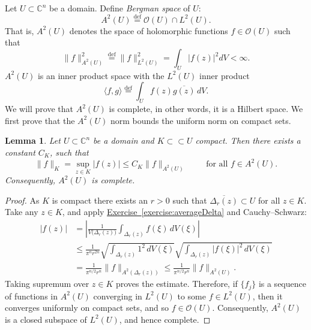 \documentclass[12pt,openany]{book}
\newcommand{\linnprod}[2]{\langle #1 , #2 \rangle}
\newcommand{\sabs}[1]{\lvert {#1} \rvert}
\newcommand{\snorm}[1]{\lVert {#1} \rVert}
\newcommand{\abs}[1]{\left\lvert {#1} \right\rvert}
\newcommand{\C}{{\mathbb{C}}}
\newcommand{\sO}{{\mathscr{O}}}
\newcommand{\myindex}[1]{#1\index{#1}}
\theoremstyle{plain}
\newtheorem{lemma}[thm]{Lemma}
\theoremstyle{remark}
\theoremstyle{definition}
\theoremstyle{exercise}
\theoremstyle{example}
\newcommand{\exerciseref}[1]{\hyperref[#1]{Exercise~\ref*{#1}}}
\begin{document}
Let $U \subset \C^n$ be a domain.  Define
\emph{\myindex{Bergman space}} of $U$:
%
%
\begin{equation*}
A^2(U) \overset{\text{def}}{=} \sO(U) \cap L^2(U) .
\end{equation*}
That is, $A^2(U)$ denotes the space
of holomorphic functions $f \in \sO(U)$ such that
%
\begin{equation*}
\snorm{f}_{A^2(U)}^2 \overset{\text{def}}{=} \snorm{f}_{L^2(U)}^2
= \int_U \sabs{f(z)}^2 dV < \infty .
\end{equation*}
$A^2(U)$ is
an inner product space with the
$L^2(U)$ inner product
%
\begin{equation*}
\linnprod{f}{g} \overset{\text{def}}{=} \int_U f(z) \overline{g(z)} \, dV .
\end{equation*}
We will prove that $A^2(U)$ is
complete, in other words, it is a Hilbert space.  We first
prove that
the $A^2(U)$ norm bounds the
uniform norm on compact sets.

\begin{lemma} \label{lemma:bergmanKbound}
Let $U \subset \C^n$ be a domain and $K \subset \subset U$ compact.  Then
there exists a constant $C_K$, such that
\begin{equation*}
\snorm{f}_K
=
\sup_{z \in K} \sabs{f(z)} 
\leq C_K \snorm{f}_{A^2(U)} 
\qquad \text{ for all } f\in A^2(U) .
\end{equation*}
Consequently, $A^2(U)$ is complete.
\end{lemma}

\begin{proof}
As $K$ is compact there exists an $r > 0$ such that
$\overline{\Delta_r(z)} \subset U$
for all $z \in K$.
Take any $z \in K$, and
apply \exerciseref{exercise:averageDelta} and Cauchy--Schwarz:
\begin{equation*}
\begin{split}
\abs{f(z)} &=
\abs{\frac{1}{V\bigl(\Delta_r(z)\bigr)} \int_{\Delta_r(z)} f(\xi) \,
dV(\xi)}
\\
& \leq
\frac{1}{\pi^n r^{2n}}
\sqrt{\int_{\Delta_r(z)} 1^2 \, dV(\xi)}
\sqrt{\int_{\Delta_r(z)} \abs{f(\xi)}^2 \, dV(\xi)}
\\
& =
\frac{1}{\pi^{n/2} r^n}
\snorm{f}_{A^2(\Delta_r(z))} 
\leq
\frac{1}{\pi^{n/2} r^n}
\snorm{f}_{A^2(U)} .
\end{split}
\end{equation*}
Taking supremum over $z \in K$ proves the estimate.
Therefore, if $\{ f_j \}$ is a sequence of functions in $A^2(U)$
converging in $L^2(U)$ to some $f \in
L^2(U)$, then it converges uniformly on compact sets, and so $f \in \sO(U)$.
Consequently, $A^2(U)$ is a closed subspace of $L^2(U)$, and hence complete.
\end{proof}
\end{document}
